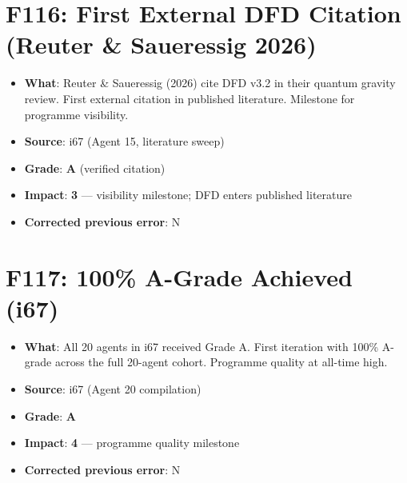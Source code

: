 \documentclass[11pt,a4paper]{article}
\newcommand{\grade}[1]{\textbf{#1}}
\newcommand{\impact}[1]{\textbf{#1}}
\begin{document}
\section{F116: First External DFD Citation (Reuter \& Saueressig 2026)}
\begin{itemize}[nosep]
\item \textbf{What}: Reuter \& Saueressig (2026) cite DFD v3.2 in their quantum gravity review. First external citation in published literature. Milestone for programme visibility.
\item \textbf{Source}: i67 (Agent 15, literature sweep)
\item \textbf{Grade}: \grade{A} (verified citation)
\item \textbf{Impact}: \impact{3} --- visibility milestone; DFD enters published literature
\item \textbf{Corrected previous error}: N
\end{itemize}

\section{F117: 100\% A-Grade Achieved (i67)}
\begin{itemize}[nosep]
\item \textbf{What}: All 20 agents in i67 received Grade A. First iteration with 100\% A-grade across the full 20-agent cohort. Programme quality at all-time high.
\item \textbf{Source}: i67 (Agent 20 compilation)
\item \textbf{Grade}: \grade{A}
\item \textbf{Impact}: \impact{4} --- programme quality milestone
\item \textbf{Corrected previous error}: N
\end{itemize}

\end{document}
